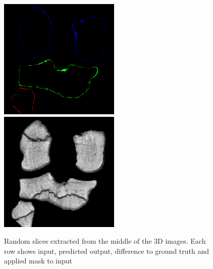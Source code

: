 \begin{figure}[H]
\endminipage\hfill
{}%
  \includegraphics[width=\linewidth]{imgs/c4.png}
\endminipage\hfill
{}%
  \includegraphics[width=\linewidth]{imgs/d4.png}
\endminipage
\caption{Random slices extracted from the middle of the 3D images. Each row shows input, predicted output, difference to ground truth and applied mask to input}
\end{figure}

